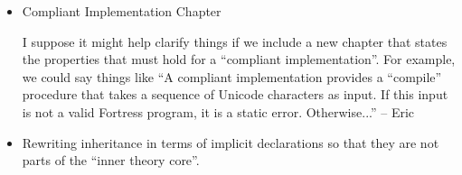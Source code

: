 \begin{itemize}
Idioms are like properties but they are hints to compilers.  Like
properties, idioms describe that the left-hand-side and right-hand-side of
$\Rightarrow$ are same.  Unlike properties, idioms instruct compilers to
replace any occurrence of the left-hand-side of $\Rightarrow$ to the
right-hand-side of $\Rightarrow$.  For example,
\begin{Fortress}
\(\KWD{idiom} \forall (x\COLON \mathbb{Z}, y \mathrel{\mathtt{:}} \mathbb{Z})\; \VAR{floor}(x/y) \Rightarrow \VAR{floordiv}(x,y)\)\\
\(\KWD{idiom} x/N ({log}_{2} N=k) \Rightarrow x \gg k\)\\
\(\KWD{idiom} \VAR{floor}(x/(\OPR{MAXINT}-1)) \Rightarrow 0\)\\
\(\KWD{test} \VAR{data}[] = \{\,-\OPR{MAXINT}-1, -\OPR{MAXINT}, -\OPR{MAXINT}+1, -2, -1, 0, 1, 2, \OPR{MAXINT}-1, \OPR{MAXINT}, 43\,\} \)
\end{Fortress}
[The last two idioms were by David, intended as illustrations
of screw cases.]
a unit testing framework should check that
$floor(x/y)$ and $floordiv(x,y)$ are same and the compiler should replace
any occurrence of $floor(x/y)$ to $floordiv(x,y)$.

\item Compliant Implementation Chapter

I suppose it might help clarify things if we include a new chapter  that
states the properties that must hold for a ``compliant  implementation''.
For example, we could say things like ``A compliant  implementation
provides a ``compile'' procedure that takes a sequence  of Unicode
characters as input.  If this input is not a valid Fortress  program, it is
a static error.  Otherwise...'' -- Eric

\item Rewriting inheritance in terms of implicit declarations so that they
  are not parts of the ``inner theory core''.


\end{itemize}
